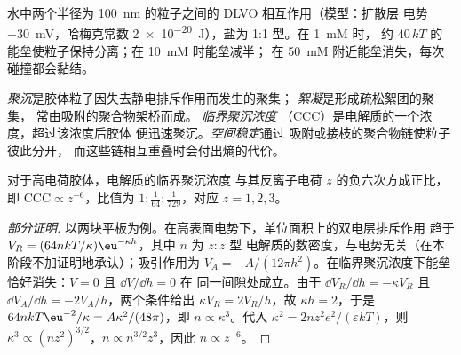 \begin{omfigure}

{\small 水中两个半径为 \qty{100}{nm} 的粒子之间的 DLVO 相互作用（模型：扩散层
电势 \qty{-30}{mV}，哈梅克常数 \qty{2e-20}{J}），盐为 1:1 型。在 \qty{1}{mM} 时，
约 $40\,kT$ 的能垒使粒子保持分离；在 \qty{10}{mM} 时能垒减半；
在 \qty{50}{mM} 附近能垒消失，每次碰撞都会黏结。}
\end{omfigure}

\begin{definition}[聚沉与稳定]\label{def:b3:colloids:stability}
\emph{聚沉}是胶体粒子因失去静电排斥作用而发生的聚集；
\emph{絮凝}是形成疏松絮团的聚集，
常由吸附的聚合物架桥而成。
\emph{临界聚沉浓度}
（CCC）是电解质的一个浓度，超过该浓度后胶体
便迅速聚沉。\emph{空间稳定}通过
吸附或接枝的聚合物链使粒子彼此分开，
而这些链相互重叠时会付出熵的代价。
\end{definition}

\begin{proposition}\label{prop:b3:colloids:schulze-hardy}
对于高电荷胶体，电解质的临界聚沉浓度
与其反离子电荷 $z$ 的负六次方成正比，
即 $\text{CCC} \propto z^{-6}$，比值为 $1 : \frac{1}{64} : \frac{1}{729}$，对应 $z = 1, 2, 3$。
\end{proposition}

\begin{proof}[部分证明]
以两块平板为例。在高表面电势下，单位面积上的双电层排斥作用
趋于 $V_R = (64nkT/\kappa)\eu^{-\kappa h}$，其中 $n$ 为 $z{:}z$ 型
电解质的数密度，与电势无关（在本阶段不加证明地承认）；吸引作用为 $V_A =
-A/(12\pi h^2)$。在临界聚沉浓度下能垒恰好消失：$V = 0$ 且 $\dd V/\dd h = 0$ 在
同一间隙处成立。由于 $\dd V_R/\dd h = -\kappa V_R$ 且 $\dd V_A/\dd h = -2V_A/h$，两个条件给出
$\kappa V_R = 2V_R/h$，故 $\kappa h = 2$，于是 $64nkT\eu^{-2}/\kappa = A\kappa^2/(48\pi)$，即 $n \propto \kappa^3$。代入
$\kappa^2 = 2nz^2e^2/(\varepsilon kT)$，则 $\kappa^3 \propto (nz^2)^{3/2}$，$n \propto n^{3/2}z^3$，因此 $n \propto z^{-6}$。
\end{proof}

